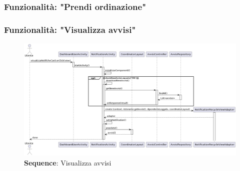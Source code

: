 \subsubsection{Funzionalità: "Prendi ordinazione"}
\subsubsection{Funzionalità: "Visualizza avvisi"}
\begin{figure}[H]
    \centering
    \includegraphics[scale=0.4]{assets/diagrammi/Sequence di design/Visualizza avvisi.png}
    \caption{\textbf{Sequence}: Visualizza avvisi}\label{fig:seq_view_avvisi}
\end{figure}

\newpage